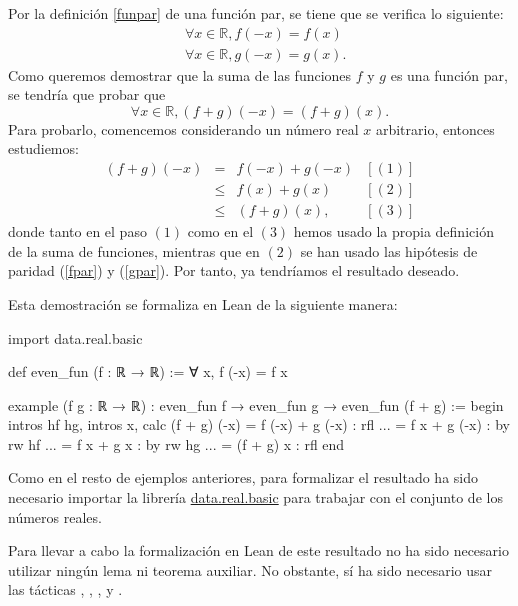 \begin{demostracion}
  Por la definición \ref{funpar} de una función par, se tiene que se
  verifica lo siguiente:
  \begin{align}
    & ∀ x ∈ ℝ, f(-x)=f(x)  \label{fpar} \\
    & ∀ x ∈ ℝ, g(-x)=g(x). \label{gpar}
  \end{align}
  Como queremos demostrar que la suma de las funciones \(f\) y \(g\) es
  una función par, se tendría que probar que
  \begin{equation}
    ∀ x ∈ ℝ, (f+g)(-x) = (f+g)(x).
  \end{equation}
  Para probarlo, comencemos considerando un número real \(x\)
  arbitrario, entonces estudiemos:
  \[\begin{array}{llll}
      (f+g)(-x) &= &f(-x)+g(-x) & [(1)]\\
                &≤ &f(x)+g(x)   & [(2)] \\
                &≤ &(f+g)(x),   & [(3)]
    \end{array}\]
  donde tanto en el paso \((1)\) como en el \((3)\) hemos usado la
  propia definición de la suma de funciones, mientras que en \((2) \) se
  han usado las hipótesis de paridad (\ref{fpar}) y (\ref{gpar}). Por
  tanto, ya tendríamos el resultado deseado.
\end{demostracion}

Esta demostración se formaliza en Lean de la siguiente manera:
\begin{leancode}
import data.real.basic

def even_fun (f : ℝ → ℝ) := ∀ x, f (-x) = f x

example
  (f g : ℝ → ℝ)
  : even_fun f → even_fun g →  even_fun (f + g) :=
begin
  intros hf hg,
  intros x,
  calc (f + g) (-x)
      = f (-x) + g (-x) : rfl
  ... = f x + g (-x)    : by rw hf
  ... = f x + g x       : by rw hg
  ... = (f + g) x       : rfl
end
\end{leancode}

Como en el resto de ejemplos anteriores, para formalizar el resultado ha
sido necesario importar la librería
\href{https://github.com/leanprover-community/mathlib/blob/master/src/data/real/basic.lean}{data.real.basic}
para trabajar con el conjunto de los números reales.

Para llevar a cabo la formalización en Lean de este resultado no ha sido
necesario utilizar ningún lema ni teorema auxiliar. No obstante, sí ha
sido necesario usar las tácticas
,
,
,
 y
.

